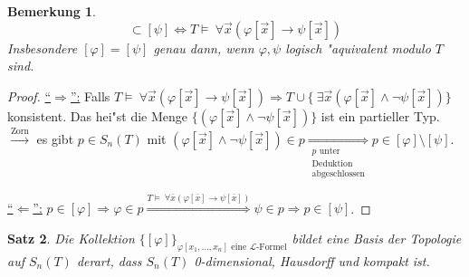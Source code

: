 \documentclass[a4paper,12pt,numbers=noenddot,parskip=full]{scrartcl}
\newcommand{\Forall}{~\forall}
\newcommand{\Exists}{~\exists}
\newcommand{\scrL}{\mathcal{L}}
\theoremstyle{dotless}
\newtheorem{theorem}{Satz}[section]
\newtheorem{remark}[theorem]{Bemerkung}
\begin{document}
\begin{remark}
	\begin{equation*}
		[\varphi] \subset [\psi] \Longleftrightarrow T \models \Forall \vec{x}(\varphi[\vec{x}] \rightarrow \psi[\vec{x}])
	\end{equation*}
	Insbesondere $[\varphi] = [\psi]$ genau dann, wenn $\varphi, \psi$ logisch "aquivalent modulo $T$ sind.
\end{remark}
\begin{proof}
	\underline{"`$\Rightarrow$"':} Falls $T \models \Forall \vec{x}(\varphi[\vec{x}] \rightarrow \psi [\vec{x}]) \Longrightarrow T \cup \{\Exists \vec{x} (\varphi[\vec{x}]\land \lnot \psi[\vec{x}]) \}$ konsistent. Das hei"st die Menge $\{(\varphi[\vec{x}] \land \lnot \psi[\vec{x}]) \}$ ist ein partieller Typ.\\
	$\overset{\text{Zorn}}{\longrightarrow}$ es gibt $p \in S_n(T)$ mit $(\varphi[\vec{x}] \land \lnot \psi[\vec{x}]) \in p \underset{\substack{p\text{ unter}\\\text{Deduktion}\\\text{abgeschlossen}}}{\Longrightarrow} p \in [\varphi] \setminus [\psi]$.
	
	\underline{"`$\Leftarrow$"':} $p \in [\varphi] \Rightarrow \varphi \in p \overset{T \models \Forall \bar{x}(\varphi[\bar{x}]\rightarrow\psi[\bar{x}])}{\Longrightarrow} \psi \in p \Rightarrow p \in [\psi]$.
\end{proof}
\begin{theorem}
	Die Kollektion $\{[\varphi] \}_{\varphi[x_1, \dots, x_n] \text{ eine }\scrL \text{-Formel}}$ bildet eine Basis der Topologie auf $S_n(T)$ derart, dass $S_n(T)$ 0-dimensional, Hausdorff und kompakt ist.
\end{theorem}
\end{document}
